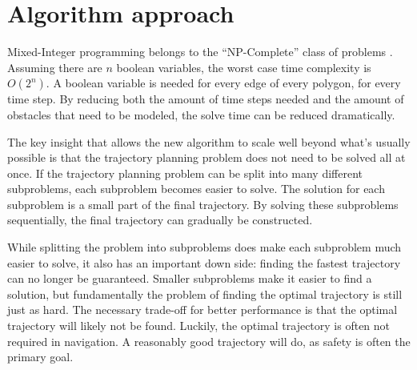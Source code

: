 \section{Algorithm approach}
Mixed-Integer programming belongs to the ``NP-Complete'' class of problems \cite{DBLP:conf/coco/Karp72}. Assuming there are $n$ boolean variables, the worst case time complexity is $O(2^n)$. A boolean variable is needed for every edge of every polygon, for every time step. By reducing both the amount of time steps needed and the amount of obstacles that need to be modeled, the solve time can be reduced dramatically.
\par
The key insight that allows the new algorithm to scale well beyond what's usually possible is that the trajectory planning problem does not need to be solved all at once. If the trajectory planning problem can be split into many different subproblems, each subproblem becomes easier to solve. The solution for each subproblem is a small part of the final trajectory. By solving these subproblems sequentially, the final trajectory can gradually be constructed.
\par
While splitting the problem into subproblems does make each subproblem much easier to solve, it also has an important down side: finding the fastest trajectory can no longer be guaranteed. Smaller subproblems make it easier to find a solution, but fundamentally the problem of finding the optimal trajectory is still just as hard. The necessary trade-off for better performance is that the optimal trajectory will likely not be found. Luckily, the optimal trajectory is often not required in navigation. A reasonably good trajectory will do, as safety is often the primary goal.

